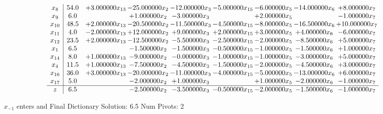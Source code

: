 \documentclass[10pt]{article}
\begin{document}
 \[\begin{array}{c| c c@{\hskip 2pt} c@{\hskip 2pt} c@{\hskip 2pt} c@{\hskip 2pt} c@{\hskip 2pt} c@{\hskip 2pt} c@{\hskip 2pt} }
 x_{8}   &  54.0 & + 3.000000 x_{13} & -25.000000 x_{2} & -12.000000 x_{3} & -5.000000 x_{15} & -6.000000 x_{5} & -14.000000 x_{6} & + 8.000000 x_{7}\\
 x_{9}   &  6.0  &   & + 1.000000 x_{2} & -3.000000 x_{3} &   & + 2.000000 x_{5} &   & -1.000000 x_{7}\\
 x_{10}   &  48.5 & + 2.000000 x_{13} & -20.500000 x_{2} & -11.500000 x_{3} & -4.500000 x_{15} & -8.000000 x_{5} & -16.500000 x_{6} & + 10.000000 x_{7}\\
 x_{11}   &  4.0 & -2.000000 x_{13} & + 12.000000 x_{2} & + 9.000000 x_{3} & + 2.000000 x_{15} & + 3.000000 x_{5} & + 4.000000 x_{6} & -6.000000 x_{7}\\
 x_{12}   &  23.5 & + 2.000000 x_{13} & -12.500000 x_{2} & -5.500000 x_{3} & -2.500000 x_{15} & -2.000000 x_{5} & -8.500000 x_{6} & + 5.000000 x_{7}\\
 x_{1}   &  6.5  &   & -1.500000 x_{2} & -1.500000 x_{3} & -0.500000 x_{15} & -1.000000 x_{5} & -1.500000 x_{6} & + 1.000000 x_{7}\\
 x_{14}   &  8.0 & + 1.000000 x_{13} & -9.000000 x_{2} & -0.000000 x_{3} & -1.000000 x_{15} & -1.000000 x_{5} & -3.000000 x_{6} & + 5.000000 x_{7}\\
 x_{4}   &  11.5 & + 1.000000 x_{13} & -7.500000 x_{2} & -4.500000 x_{3} & -1.500000 x_{15} & -2.000000 x_{5} & -4.500000 x_{6} & + 3.000000 x_{7}\\
 x_{16}   &  36.0 & + 3.000000 x_{13} & -20.000000 x_{2} & -11.000000 x_{3} & -4.000000 x_{15} & -5.000000 x_{5} & -13.000000 x_{6} & + 6.000000 x_{7}\\
 x_{17}   &  5.0  &   & -2.000000 x_{2} & + 1.000000 x_{3} &   & + 1.000000 x_{5} & -2.000000 x_{6} & -1.000000 x_{7}\\
\hline
z    &  6.5  &   & -2.500000 x_{2} & -3.500000 x_{3} & -0.500000 x_{15} & -2.000000 x_{5} & -1.500000 x_{6} & -1.000000 x_{7}\\
\end{array}\]


 $ x_{-1} $ enters and Final Dictionary
Solution:  6.5
Num Pivots:  2
\end{document}
